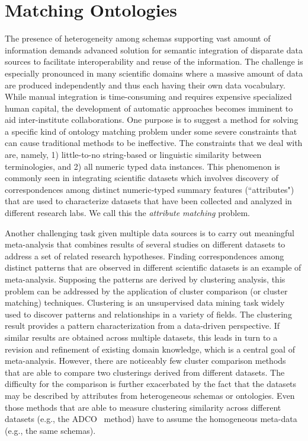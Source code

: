 \section{Matching Ontologies}
The presence of heterogeneity among schemas supporting vast amount of information demands advanced solution for semantic integration of disparate data sources to facilitate interoperability and reuse of the information. The challenge is especially pronounced in many scientific domains where a massive amount of data are produced independently and thus each having their own data vocabulary. While manual integration is time-consuming and requires expensive specialized human capital, the development of automatic approaches becomes imminent to aid inter-institute collaborations. One purpose is to suggest a method for solving a specific kind of ontology matching problem under some severe constraints that can cause traditional methods to be ineffective. The constraints that we deal with are, namely, 1) little-to-no string-based or linguistic similarity between terminologies, and 2) all numeric typed data instances. This phenomenon is commonly seen in integrating scientific datasets which involves discovery of correspondences among distinct numeric-typed summary features (``attributes") that are used to characterize datasets that have been collected and analyzed in different research labs. We call this the \emph{attribute matching} problem.

Another challenging task given multiple data sources is to carry out meaningful meta-analysis that combines results of several studies on different datasets to address a set of related research hypotheses. Finding correspondences among distinct patterns that are observed in different scientific datasets is an example of meta-analysis. Supposing the patterns are derived by clustering analysis, this problem can be addressed by the application of cluster comparison (or cluster matching) techniques. Clustering is an unsupervised data mining task widely used to discover patterns and relationships in a variety of fields. The clustering result provides a pattern characterization from a data-driven perspective. If similar results are obtained across multiple datasets, this leads in turn to a revision and refinement of existing domain knowledge, which is a central goal of meta-analysis. However, there are noticeably few cluster comparison methods that are able to compare two clusterings derived from different datasets. The difficulty for the comparison is further exacerbated by the fact that the datasets may be described by attributes from heterogeneous schemas or ontologies. Even those methods that are able to measure clustering similarity across different datasets (e.g., the ADCO~\cite{Bae2010} method) have to assume the homogeneous meta-data (e.g., the same schemas).

